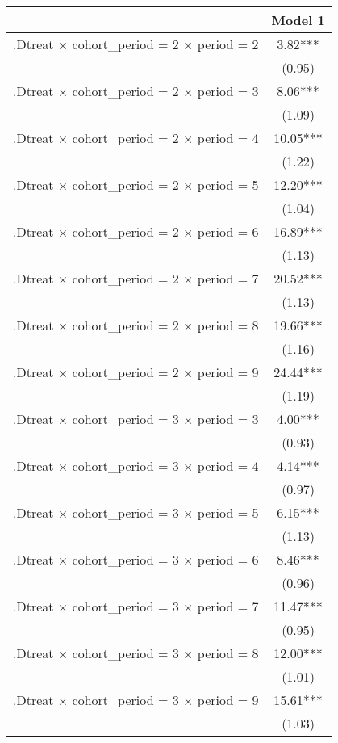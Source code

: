 \begin{table}
\centering
\begin{tabular}[t]{lc}
\toprule
  & Model 1\\
\midrule
.Dtreat × cohort\_period = 2 × period = 2 & \num{3.82}***\\
 & \vphantom{1} (\num{0.95})\\
.Dtreat × cohort\_period = 2 × period = 3 & \num{8.06}***\\
 & (\num{1.09})\\
.Dtreat × cohort\_period = 2 × period = 4 & \num{10.05}***\\
 & (\num{1.22})\\
.Dtreat × cohort\_period = 2 × period = 5 & \num{12.20}***\\
 & (\num{1.04})\\
.Dtreat × cohort\_period = 2 × period = 6 & \num{16.89}***\\
 & \vphantom{2} (\num{1.13})\\
.Dtreat × cohort\_period = 2 × period = 7 & \num{20.52}***\\
 & \vphantom{1} (\num{1.13})\\
.Dtreat × cohort\_period = 2 × period = 8 & \num{19.66}***\\
 & (\num{1.16})\\
.Dtreat × cohort\_period = 2 × period = 9 & \num{24.44}***\\
 & (\num{1.19})\\
.Dtreat × cohort\_period = 3 × period = 3 & \num{4.00}***\\
 & \vphantom{2} (\num{0.93})\\
.Dtreat × cohort\_period = 3 × period = 4 & \num{4.14}***\\
 & (\num{0.97})\\
.Dtreat × cohort\_period = 3 × period = 5 & \num{6.15}***\\
 & (\num{1.13})\\
.Dtreat × cohort\_period = 3 × period = 6 & \num{8.46}***\\
 & \vphantom{1} (\num{0.96})\\
.Dtreat × cohort\_period = 3 × period = 7 & \num{11.47}***\\
 & (\num{0.95})\\
.Dtreat × cohort\_period = 3 × period = 8 & \num{12.00}***\\
 & (\num{1.01})\\
.Dtreat × cohort\_period = 3 × period = 9 & \num{15.61}***\\
 & (\num{1.03})\\

\end{tabular}
\end{table}

